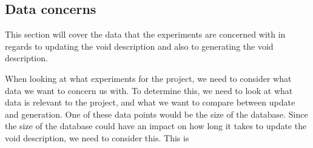 \subsection{Data concerns}\label{sec:concerns}
This section will cover the data that the experiments are concerned with in regards to updating the void description and also to generating the void description.


When looking at what experiments for the project, we need to consider what data we want to concern us with. To determine this, we need to look at what data is relevant to the project, and what we want to compare between update and generation.
One of these data points would be the size of the database. Since the size of the database could have an impact on how long it takes to update the void description, we need to consider this. This is